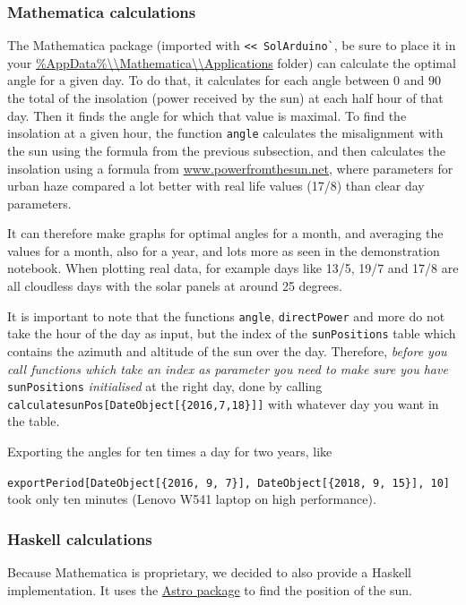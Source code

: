 \documentclass{article}
\begin{document}
    \subsubsection{Mathematica calculations}\label{subsec:mathematicaCalculations}

    The Mathematica package (imported with \verb|<< SolArduino`|, be sure to place it in your
    \url{\%AppData\%\\Mathematica\\Applications} folder) can calculate the optimal angle for a given day.
    To do that, it calculates for each angle between $0$ and $90$ the total of the insolation (power received by the sun) at each half hour of that day.
    Then it finds the angle for which that value is maximal.
    To find the insolation at a given hour, the function \verb|angle| calculates the misalignment with the sun using the formula from the previous subsection, and then calculates the insolation using a formula from \href{http://www.powerfromthesun.net/Book/chapter02/chapter02.html#ZEqnNum929295 }{www.powerfromthesun.net}, where parameters for urban haze compared a lot better with real life values (17/8) than clear day parameters.

    It can therefore make graphs for optimal angles for a month, and averaging the values for a month, also for a year, and lots more as seen in the demonstration notebook.
    When plotting real data, for example days like 13/5, 19/7 and 17/8 are all cloudless days with the solar panels at around 25 degrees.

    It is important to note that the functions \verb|angle|, \verb|directPower| and more do not take the hour of the day as input, but the index of the \verb|sunPositions| table which contains the azimuth and altitude of the sun over the day.
    Therefore, \textit{before you call functions which take an index as parameter you need to make sure you have }\verb|sunPositions| \textit{initialised} at the right day, done by calling \verb|calculatesunPos[DateObject[{2016,7,18}]]| with whatever day you want in the table.

    Exporting the angles for ten times a day for two years, like

    \verb|exportPeriod[DateObject[{2016, 9, 7}], DateObject[{2018, 9, 15}], 10]| took only ten minutes (Lenovo W541 laptop on high performance).

    \subsubsection{Haskell calculations}

    Because Mathematica is proprietary, we decided to also provide a Haskell implementation.
    It uses the \href{https://hackage.haskell.org/package/astro}{Astro package} to find the position of the sun.
\end{document}
